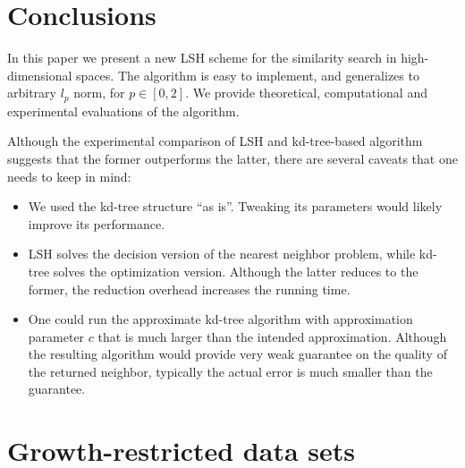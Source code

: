 \documentclass[12pt]{article}
\begin{document}

\section{Conclusions}

In this paper we present a new LSH scheme for the similarity search in high-dimensional spaces.
The algorithm is easy to implement, and generalizes to arbitrary $l_p$ norm, for $p \in [0,2]$.
We provide theoretical, computational and experimental evaluations of the algorithm.

Although the experimental comparison of LSH and kd-tree-based algorithm suggests that the former outperforms the latter, there are several caveats that one needs to keep in mind:
\begin{itemize}
\item We used the kd-tree structure ``as is''. Tweaking its parameters would likely improve its performance.
\item LSH solves the decision version of the nearest neighbor problem, while kd-tree solves the optimization version.
Although the latter reduces to the former, the reduction overhead increases the running time.
\item One could run the approximate kd-tree algorithm with approximation parameter $c$ that is much larger than the intended approximation.
Although the resulting algorithm would provide very weak guarantee on the quality of the returned neighbor, typically the actual error is much smaller than the guarantee.
\end{itemize}





{\footnotesize



}



















\appendix


\section{Growth-restricted data sets}
\end{document}
